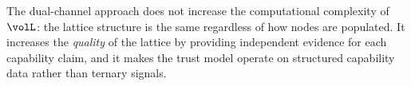 The dual-channel approach does not increase the computational complexity of
$\volL$: the lattice structure is the same regardless of how nodes are
populated. It increases the \emph{quality} of the lattice by providing
independent evidence for each capability claim, and it makes the trust model
operate on structured capability data rather than ternary signals.
